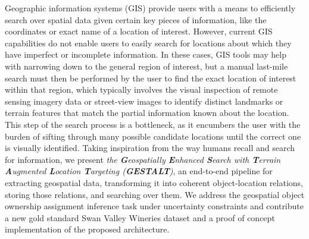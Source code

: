 

Geographic information systems (GIS) provide users with a means to efficiently search over spatial data given certain key pieces of information, like the coordinates or exact name of a location of interest. However, current GIS capabilities do not enable users to easily search for locations about which they have imperfect or incomplete information. In these cases, GIS tools may help with narrowing down to the general region of interest, but a manual last-mile search must then be performed by the user to find the exact location of interest within that region, which typically involves the visual inspection of remote sensing imagery data or street-view images to identify distinct landmarks or terrain features that match the partial information known about the location. This step of the search process is a bottleneck, as it encumbers the user with the burden of sifting through many possible candidate locations until the correct one is visually identified. Taking inspiration from the way humans recall and search for information, we present \textit{the \textbf{G}eospatially \textbf{E}nhanced \textbf{S}earch with \textbf{T}errain \textbf{A}ugmented \textbf{L}ocation \textbf{T}argeting (\textbf{GESTALT})}, an end-to-end pipeline for extracting geospatial data, transforming it into coherent object-location relations, storing those relations, and searching over them. We address the geospatial object ownership assignment inference task under uncertainty constraints and contribute a new gold standard Swan Valley Wineries dataset and a proof of concept implementation of the proposed architecture.
